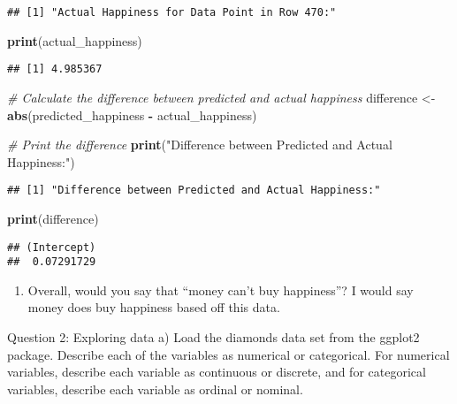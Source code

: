 \documentclass[
]{article}
\newenvironment{Shaded}{\begin{snugshade}}{\end{snugshade}}
\newcommand{\CommentTok}[1]{\textcolor[rgb]{0.56,0.35,0.01}{\textit{#1}}}
\newcommand{\FunctionTok}[1]{\textcolor[rgb]{0.13,0.29,0.53}{\textbf{#1}}}
\newcommand{\NormalTok}[1]{#1}
\newcommand{\OtherTok}[1]{\textcolor[rgb]{0.56,0.35,0.01}{#1}}
\newcommand{\SpecialCharTok}[1]{\textcolor[rgb]{0.81,0.36,0.00}{\textbf{#1}}}
\newcommand{\StringTok}[1]{\textcolor[rgb]{0.31,0.60,0.02}{#1}}
\providecommand{\tightlist}{%
  \setlength{\itemsep}{0pt}\setlength{\parskip}{0pt}}
\begin{document}
\begin{verbatim}
## [1] "Actual Happiness for Data Point in Row 470:"
\end{verbatim}

\begin{Shaded}
\begin{Highlighting}[]
\FunctionTok{print}\NormalTok{(actual\_happiness)}
\end{Highlighting}
\end{Shaded}

\begin{verbatim}
## [1] 4.985367
\end{verbatim}

\begin{Shaded}
\begin{Highlighting}[]
\CommentTok{\# Calculate the difference between predicted and actual happiness}
\NormalTok{difference }\OtherTok{\textless{}{-}} \FunctionTok{abs}\NormalTok{(predicted\_happiness }\SpecialCharTok{{-}}\NormalTok{ actual\_happiness)}

\CommentTok{\# Print the difference}
\FunctionTok{print}\NormalTok{(}\StringTok{"Difference between Predicted and Actual Happiness:"}\NormalTok{)}
\end{Highlighting}
\end{Shaded}

\begin{verbatim}
## [1] "Difference between Predicted and Actual Happiness:"
\end{verbatim}

\begin{Shaded}
\begin{Highlighting}[]
\FunctionTok{print}\NormalTok{(difference)}
\end{Highlighting}
\end{Shaded}

\begin{verbatim}
## (Intercept) 
##  0.07291729
\end{verbatim}

\begin{enumerate}
\def\labelenumi{\alph{enumi})}
\setcounter{enumi}{5}
\tightlist
\item
  Overall, would you say that ``money can't buy happiness''? I would say
  money does buy happiness based off this data.
\end{enumerate}

Question 2: Exploring data a) Load the diamonds data set from the
ggplot2 package. Describe each of the variables as numerical or
categorical. For numerical variables, describe each variable as
continuous or discrete, and for categorical variables, describe each
variable as ordinal or nominal.
\end{document}
